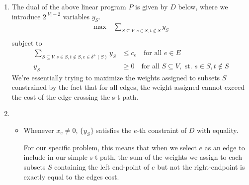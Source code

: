 \documentclass[12pt]{exam}
\newtheorem{lemma}[theorem]{Lemma}
\begin{document}
\begin{questions}
\begin{solution}
\begin{enumerate}[label=(\alph*)]
      \begin{lemma}
        All simple s-t paths of $G$ correspond to a 0-1 feasible solution of $P$ with the same objective function values.
      \end{lemma}
      \begin{proof}
        Suppose we have a simple s-t path $p \in G$. Then for each $e \in p$, let $x_e = 1$ and $x_e = 0$ otherwise. This satisfies $x_e \geq 0$ for all $e \in E$. Furthermore, since it is an s-t path, for all $S \subseteq V$ where $s \in S$ and $t \notin S$, the path must have at least one edge that crosses out of $S$. As such, \ref{p7:constraint2_1} is also satisfied.

        Furthermore, the cost of the path is given by $\sum_{e \in E} c_e x_e$, which is the same objective value as the linear program.
      \end{proof}
      This concludes our proof.

      \item
        The dual of the above linear program $P$ is given by $D$ below, where we introduce $2^{|V|-2}$ variables $y_S$.
        \begin{align}
            \text{max} \quad \sum_{S \subseteq V: s\in S, t \notin S } y_S \label{p7:dual_obj_2} \\
          \end{align}
          subject to
          \begin{align}
            \sum_{S\subseteq V: s\in S, t\notin S, e\in \delta^+(S)} y_S &\leq c_e \quad \text{for all } e \in E \label{p7_dual:constraint2_1} \\
            y_S &\geq 0 \quad \text{for all } S \subseteq V, \text{ st. } s \in S, t \notin S \label{p7_dual:constraint2_2}
          \end{align}
          We're essentially trying to maximize the weights assigned to subsets $S$ constrained by the fact that for all edges, the weight assigned cannot exceed the cost of the edge crossing the s-t path.

        \item
          \begin{itemize}
          \item
            Whenever $x_e \neq 0$, $\{y_S\}$ satisfies the $e$-th constraint of $D$ with equality.

            For our specific problem, this means that when we select $e$ as an edge to include in our simple s-t path, the sum of the weights we assign to each subsets $S$ containing the left end-point of $e$ but not the right-endpoint is exactly equal to the edges cost.


\end{itemize}
\end{enumerate}
\end{solution}
\end{questions}
\end{document}
